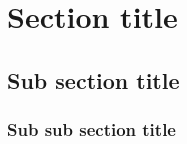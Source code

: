 \documentclass[../thesis-main/thesis.tex]{subfiles}
\begin{document}
\section{Section title}

\subsection{Sub section title}

\subsubsection{Sub sub section title}
\end{document}
